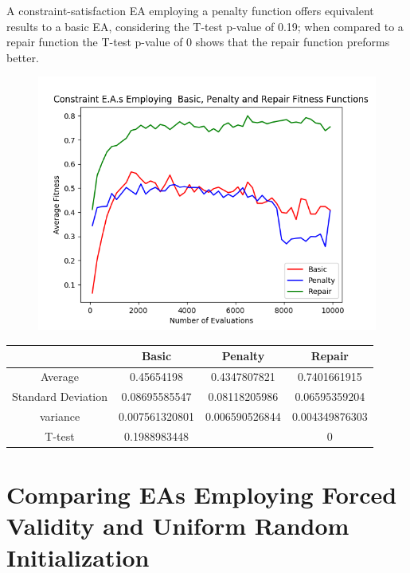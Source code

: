 \documentclass{article}
\begin{document}
			A constraint-satisfaction EA employing a penalty function offers equivalent results to a basic EA, 
			considering the T-test p-value  of 0.19; when compared to a repair function the T-test p-value of 0 shows that 	the 		repair function preforms better.
			\begin{figure}[!htb]
			\centering
			\includegraphics[scale=0.4]{q1_random_boards_penalty_vs_basic_vs_repair.png}
			\end{figure}
			
			\begin{center}
			\begin{tabular}{ || c | c | c | c ||}
			\hline
			       & Basic & Penalty & Repair \\ 
			 \hline\hline
			 Average & 0.45654198 &	0.4347807821 & 0.7401661915	 \\ 
			 \hline
			 Standard Deviation &	0.08695585547 &	0.08118205986 &	0.06595359204	 \\
			 \hline
			 variance &	0.007561320801 &	0.006590526844 &	0.004349876303 \\
			 \hline
			 T-test &	0.1988983448	& &	0 \\
			 \hline
			\end{tabular}
			\end{center}
\clearpage


\section{Comparing EAs Employing Forced Validity and Uniform Random Initialization}
\end{document}
